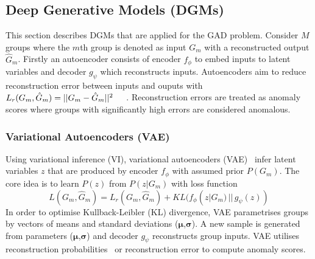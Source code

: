 \subsection{Deep Generative Models  (DGMs)}
\label{sec:adversarialAE}
This section  describes %
 DGMs that are applied for the GAD problem. %
Consider  $M$ groups  where the $m$th group is denoted as input $G_m$ with a reconstructed output ${\hat G}_m$.  Firstly an autoencoder consists of  encoder $f_\phi$ to embed  inputs to latent variables %
 and  decoder $g_\psi$ which reconstructs inputs.  Autoencoders aim to reduce reconstruction error between inputs and ouputs with 
${ L_r(G_{m},\hat G_{m} )} = ||{ G_m - \hat G_m }||^2  \hspace{0.5cm}  %
$.  
Reconstruction errors are treated as anomaly scores where groups with significantly high errors are considered anomalous. 

\subsubsection{Variational Autoencoders (VAE)}
\label{sec:Vautoencoders}
 Using variational inference (VI),   variational autoencoders (VAE)~\cite{Kingma2013}  
 infer latent variables $z$ that are produced by encoder $f_\phi$ with  assumed prior  $P(G_m)$. The core idea is to learn $P(z)$ from $P(z|G_m)$ %
with loss function 
\begin{equation}
{ L(G_m,\hat G_m)} = { L_r(G_m,\hat G_m)} + KL(f_\phi(z|G_m)\, || \, g_\psi(z))  %
\label{eqn:vaeloss}
\end{equation}
In order to optimise Kullback-Leibler (KL) divergence, VAE parametrises groups by vectors of means and standard deviations ($\boldsymbol \mu$,$\boldsymbol \sigma$).  
A new sample  is generated from parameters ($\boldsymbol \mu$,$\boldsymbol \sigma$)  and  
  decoder $g_\psi$ reconstructs group inputs.   VAE utilises reconstruction probabilities~\cite{an2015variational} or reconstruction error to compute anomaly scores.

